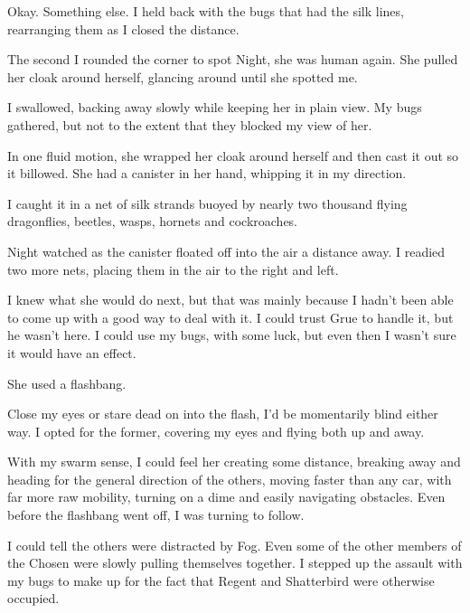 Okay.  Something else.  I held back with the bugs that had the silk lines, rearranging them as I closed the distance.



The second I rounded the corner to spot Night, she was human again.  She pulled her cloak around herself, glancing around until she spotted me.



I swallowed, backing away slowly while keeping her in plain view.  My bugs gathered, but not to the extent that they blocked my view of her.



In one fluid motion, she wrapped her cloak around herself and then cast it out so it billowed.  She had a canister in her hand, whipping it in my direction.



I caught it in a net of silk strands buoyed by nearly two thousand flying dragonflies, beetles, wasps, hornets and cockroaches.



Night watched as the canister floated off into the air a distance away.  I readied two more nets, placing them in the air to the right and left.



I knew what she would do next, but that was mainly because I hadn't been able to come up with a good way to deal with it.  I could trust Grue to handle it, but he wasn't here.  I could use my bugs, with some luck, but even then I wasn't sure it would have an effect.



She used a flashbang.



Close my eyes or stare dead on into the flash, I'd be momentarily blind either way.  I opted for the former, covering my eyes and flying both up and away.



With my swarm sense, I could feel her creating some distance, breaking away and heading for the general direction of the others, moving faster than any car, with far more raw mobility, turning on a dime and easily navigating obstacles.  Even before the flashbang went off, I was turning to follow.



I could tell the others were distracted by Fog.  Even some of the other members of the Chosen were slowly pulling themselves together.  I stepped up the assault with my bugs to make up for the fact that Regent and Shatterbird were otherwise occupied.




